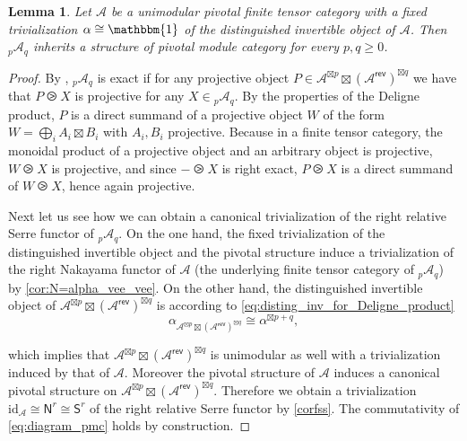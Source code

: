 \documentclass[11pt]{article}
\newtheorem{lemma}[theorem]{Lemma}
\theoremstyle{definition}
\begin{document}
\begin{lemma}\label{lem:disk_FH}
Let $\mathcal{A}$ be  a unimodular pivotal finite tensor category with a  fixed trivialization $\alpha \cong \mathbbm{1}$ of the distinguished invertible object of $\mathcal{A}$. Then ${}_p \mathcal{A}_q$ inherits a structure of pivotal module category for every $p,q \geq 0$.
\end{lemma}
\begin{proof}
By \cite[Lemma 3.2]{relserre}, ${}_p \mathcal{A}_q$ is exact if for any projective object $P\in \mathcal{A}^{\boxtimes p}\boxtimes \left( \mathcal{A}^{\mathsf{rev}} \right)^{\boxtimes q}$ we have that  $P \ogreaterthan X$ is projective for any $X \in {}_p \mathcal{A}_q$. By the properties of the Deligne product, $P$ is a direct summand of a projective object $W$ of the form $W= \bigoplus_i A_i \boxtimes B_i$ with $A_i, B_i$ projective. Because in a finite tensor category, the monoidal product of a projective object and an arbitrary object is projective, $W \ogreaterthan X$ is projective, and since $- \ogreaterthan X$ is right exact, $P \ogreaterthan X$ is a direct summand of $W \ogreaterthan X$, hence again projective.




Next let us see how we can obtain a canonical trivialization of the right relative Serre functor of ${}_p \mathcal{A}_q$. On the one hand, the fixed trivialization of the distinguished invertible object and the pivotal structure induce a trivialization of the right Nakayama functor of $\mathcal{A}$ (the underlying finite tensor category of ${}_p \mathcal{A}_q$) by \cref{cor:N=alpha_vee_vee}. On the other hand, the distinguished invertible object of $\mathcal{A}^{\boxtimes p}\boxtimes \left( \mathcal{A}^{\mathsf{rev}} \right)^{\boxtimes q}$ is according to  \eqref{eq:disting_inv_for_Deligne_product} $$ \alpha_{\mathcal{A}^{\boxtimes p}\boxtimes \left( \mathcal{A}^{\mathsf{rev}} \right)^{\boxtimes q}} \cong \alpha^{\boxtimes p+q} ,$$ 

which implies that $\mathcal{A}^{\boxtimes p}\boxtimes \left( \mathcal{A}^{\mathsf{rev}} \right)^{\boxtimes q}$ is unimodular as well with a trivialization induced by that of $\mathcal{A}$. Moreover the pivotal structure of $\mathcal{A}$ induces a canonical pivotal structure on $\mathcal{A}^{\boxtimes p}\boxtimes \left( \mathcal{A}^{\mathsf{rev}} \right)^{\boxtimes q}$. Therefore we obtain a trivialization $\mathrm{id}_\mathcal{A} \cong \mathsf{N}^r \cong \mathsf{S}^r$ of the right relative Serre functor by   \cref{corfss}. The commutativity of \eqref{eq:diagram_pmc} holds by construction.
\end{proof}
\end{document}
